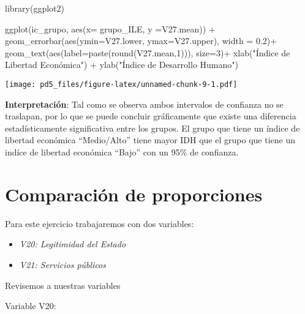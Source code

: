 \documentclass[
]{article}
\newenvironment{Shaded}{\begin{snugshade}}{\end{snugshade}}
\newcommand{\AttributeTok}[1]{\textcolor[rgb]{0.77,0.63,0.00}{#1}}
\newcommand{\DecValTok}[1]{\textcolor[rgb]{0.00,0.00,0.81}{#1}}
\newcommand{\FloatTok}[1]{\textcolor[rgb]{0.00,0.00,0.81}{#1}}
\newcommand{\FunctionTok}[1]{\textcolor[rgb]{0.00,0.00,0.00}{#1}}
\newcommand{\NormalTok}[1]{#1}
\newcommand{\SpecialCharTok}[1]{\textcolor[rgb]{0.00,0.00,0.00}{#1}}
\newcommand{\StringTok}[1]{\textcolor[rgb]{0.31,0.60,0.02}{#1}}
\begin{document}
\begin{Shaded}
\begin{Highlighting}[]
\FunctionTok{library}\NormalTok{(ggplot2)}

\FunctionTok{ggplot}\NormalTok{(ic\_grupo, }\FunctionTok{aes}\NormalTok{(}\AttributeTok{x=}\NormalTok{ grupo\_ILE, }\AttributeTok{y =}\NormalTok{V27.mean)) }\SpecialCharTok{+}
  \FunctionTok{geom\_errorbar}\NormalTok{(}\FunctionTok{aes}\NormalTok{(}\AttributeTok{ymin=}\NormalTok{V27.lower, }\AttributeTok{ymax=}\NormalTok{V27.upper), }\AttributeTok{width =} \FloatTok{0.2}\NormalTok{)}\SpecialCharTok{+}
   \FunctionTok{geom\_text}\NormalTok{(}\FunctionTok{aes}\NormalTok{(}\AttributeTok{label=}\FunctionTok{paste}\NormalTok{(}\FunctionTok{round}\NormalTok{(V27.mean,}\DecValTok{1}\NormalTok{))), }\AttributeTok{size=}\DecValTok{3}\NormalTok{)}\SpecialCharTok{+}
  \FunctionTok{xlab}\NormalTok{(}\StringTok{"Índice de Libertad Económica"}\NormalTok{) }\SpecialCharTok{+} \FunctionTok{ylab}\NormalTok{(}\StringTok{"Índice de Desarrollo Humano"}\NormalTok{)}
\end{Highlighting}
\end{Shaded}

\texttt{[image: pd5\_files/figure-latex/unnamed-chunk-9-1.pdf]}

\textbf{Interpretación}: Tal como se observa ambos intervalos de
confianza no se traslapan, por lo que se puede concluir gráficamente que
existe una diferencia estadísticamente significativa entre los grupos.
El grupo que tiene un índice de libertad económica ``Medio/Alto'' tiene
mayor IDH que el grupo que tiene un indíce de libertad económica
``Bajo'' con un 95\% de confianza.

\hypertarget{comparaciuxf3n-de-proporciones}{%
\section{\texorpdfstring{\textbf{Comparación de
proporciones}}{Comparación de proporciones}}\label{comparaciuxf3n-de-proporciones}}

Para este ejercicio trabajaremos con dos variables:

\begin{itemize}
\item
  \emph{V20: Legitimidad del Estado}
\item
  \emph{V21: Servicios públicos}
\end{itemize}

Revisemos a nuestras variables

Variable V20:
\end{document}
